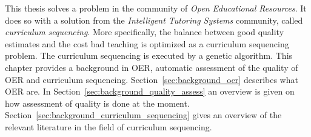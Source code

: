 This thesis solves a problem in the community of \emph{Open Educational
Resources}. It does so with a solution from the \emph{Intelligent Tutoring
Systems} community, called \emph{curriculum sequencing}. More specifically,
the balance between good quality estimates and the cost bad teaching is
optimized as a curriculum sequencing problem. The curriculum sequencing is executed by a genetic algorithm. This chapter
provides a background in OER, automatic assessment of the quality of OER and curriculum sequencing.
Section~\ref{sec:background_oer} describes what OER are. In
Section~\ref{sec:background_quality_assess} an overview is given on how assessment of
quality is done at the moment. Section~\ref{sec:background_curriculum_sequencing} gives an overview of the
relevant literature in the field of curriculum sequencing.


